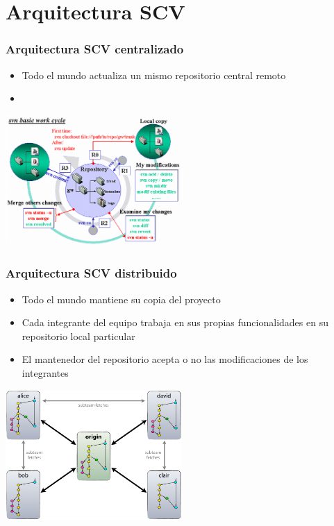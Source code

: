 \section{Arquitectura SCV}
\frame
{
\frametitle{Arquitectura SCV centralizado}
\begin{itemize}
 \item Todo el mundo actualiza un mismo repositorio central remoto
 \item 
\end{itemize}

\begin{center}
 \includegraphics[height=5cm]{imgs/svnscheme.png}
\end{center}
}

\frame
{
\frametitle{Arquitectura SCV distribuido}
\begin{itemize}
 \item Todo el mundo mantiene su copia del proyecto
 \item Cada integrante del equipo trabaja en sus propias funcionalidades en su repositorio local particular
 \item El mantenedor del repositorio acepta o no las modificaciones de los integrantes
\end{itemize}

\begin{center}
 \includegraphics[height=5cm]{imgs/gitscheme.png}
\end{center}
}